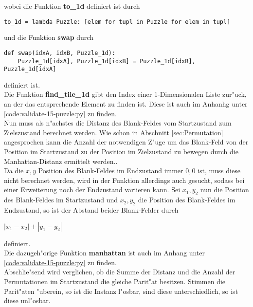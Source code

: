 wobei die Funktion \textbf{to\_1d} definiert ist durch
\vspace{.25cm}
\begin{verbatim}
to_1d = lambda Puzzle: [elem for tupl in Puzzle for elem in tupl]
\end{verbatim}
\vspace{.25cm}
und die Funktion \textbf{swap} durch
\vspace{.25cm}
\begin{verbatim}
def swap(idxA, idxB, Puzzle_1d):
    Puzzle_1d[idxA], Puzzle_1d[idxB] = Puzzle_1d[idxB], Puzzle_1d[idxA]
\end{verbatim}
\vspace{.25cm}
definiert ist.\\
Die Funktion \textbf{find\_tile\_1d} gibt den Index einer 1-Dimensionalen Liste zur"uck, an der das entsprechende Element zu finden ist. Diese ist auch im Anhanhg unter \ref{code:validate-15-puzzle:py} zu finden.\\
Nun muss als n"achstes die Distanz des Blank-Feldes vom Startzustand zum Zielszustand berechnet werden. Wie schon in Abschnitt \ref{sec:Permutation} angesprochen kann die Anzahl der notwendigen Z"uge um das Blank-Feld von der Position im Startzustand zu der Position im Zielzustand zu bewegen durch die Manhattan-Distanz ermittelt werden..\\ Da die $x,y$ Position des Blank-Feldes im Endzustand immer $0,0$ ist, muss diese nicht berechnet werden, wird in der Funktion allerdings auch gesucht, sodass bei einer Erweiterung noch der Endzustand variieren kann.
Sei $x_1,y_2$ nun die Position des Blank-Feldes im Startzustand und $x_2,y_2$ die Position des Blank-Feldes im Endzustand, so ist der Abstand beider Blank-Felder durch \\
\begin{center}
    $\left | x_1 - x_2 \right | + \left | y_1 - y_2 \right |$
\end{center}
definiert.\\
Die dazugeh"orige Funktion \textbf{manhattan} ist auch im Anhang unter \ref{code:validate-15-puzzle:py} zu finden.\\
Abschlie"send wird verglichen, ob die Summe der Distanz und die Anzahl der Permutationen im Startzustand die gleiche Parit"at besitzen. Stimmen die Parit"aten "uberein, so ist die Instanz l"osbar, sind diese unterschiedlich, so ist diese unl"osbar.

